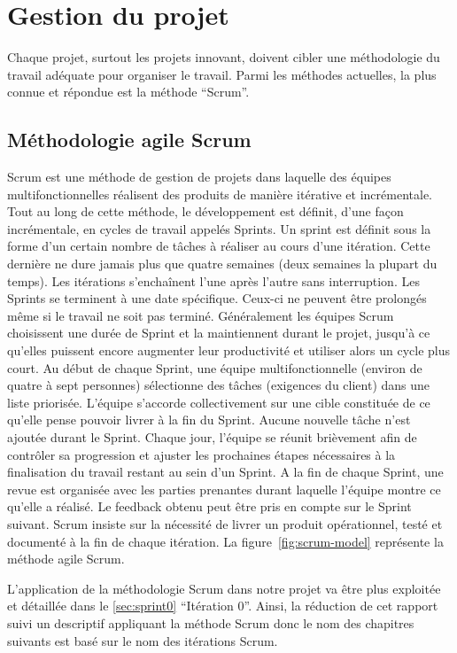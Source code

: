 \section{Gestion du projet }

Chaque projet, surtout les projets innovant, doivent cibler une méthodologie
du travail adéquate pour organiser le travail. Parmi les méthodes actuelles, la
plus connue et répondue est la méthode ``Scrum''.

\subsection{Méthodologie agile Scrum}

Scrum est une méthode de gestion de projets dans laquelle des équipes
multifonctionnelles réalisent des produits de manière itérative et
incrémentale. Tout au long de cette méthode, le développement est définit,
d'une façon incrémentale, en cycles de travail appelés Sprints. Un sprint est
définit sous la forme d'un certain nombre de tâches à réaliser au cours d'une
itération. Cette dernière ne dure jamais plus que quatre semaines (deux
semaines la plupart du temps). Les itérations s'enchaînent l'une après l'autre
sans interruption. Les Sprints se terminent à une date spécifique. Ceux-ci ne
peuvent être prolongés même si le travail ne soit pas terminé. Généralement les
équipes Scrum choisissent une durée de Sprint et la maintiennent durant le
projet, jusqu'à ce qu'elles puissent encore augmenter leur productivité et
utiliser alors un cycle plus court. Au début de chaque Sprint, une équipe
multifonctionnelle (environ de quatre à sept personnes) sélectionne des tâches
(exigences du client) dans une liste priorisée. L'équipe s'accorde
collectivement sur une cible constituée de ce qu'elle pense pouvoir livrer à la
fin du Sprint. Aucune nouvelle tâche n'est ajoutée durant le Sprint. Chaque
jour, l'équipe se réunit brièvement afin de contrôler sa progression et ajuster
les prochaines étapes nécessaires à la finalisation du travail restant au sein
d'un Sprint. A la fin de chaque Sprint, une revue est organisée avec les
parties prenantes durant laquelle l'équipe montre ce qu'elle a réalisé. Le
feedback obtenu peut être pris en compte sur le Sprint suivant. Scrum insiste
sur la nécessité de livrer un produit opérationnel, testé et documenté à la fin
de chaque itération. La figure~\ref{fig:scrum-model} représente la méthode
agile Scrum.

L'application de la méthodologie Scrum dans notre projet 
va être plus exploitée et détaillée dans le \autoref{sec:sprint0} ``Itération
0''. Ainsi, la réduction de cet rapport suivi un descriptif appliquant la
méthode Scrum donc le nom des chapitres suivants est basé sur le nom des
itérations Scrum.

